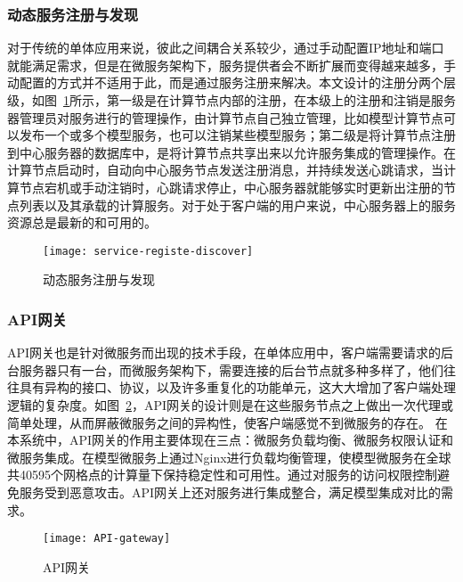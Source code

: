 \subsubsection{动态服务注册与发现}
对于传统的单体应用来说，彼此之间耦合关系较少，通过手动配置IP地址和端口就能满足需求，但是在微服务架构下，服务提供者会不断扩展而变得越来越多，手动配置的方式并不适用于此，而是通过服务注册来解决。本文设计的注册分两个层级，如图~\ref{fig:service-registe-discover}所示，第一级是在计算节点内部的注册，在本级上的注册和注销是服务器管理员对服务进行的管理操作，由计算节点自己独立管理，比如模型计算节点可以发布一个或多个模型服务，也可以注销某些模型服务；第二级是将计算节点注册到中心服务器的数据库中，是将计算节点共享出来以允许服务集成的管理操作。在计算节点启动时，自动向中心服务节点发送注册消息，并持续发送心跳请求，当计算节点宕机或手动注销时，心跳请求停止，中心服务器就能够实时更新出注册的节点列表以及其承载的计算服务。对于处于客户端的用户来说，中心服务器上的服务资源总是最新的和可用的。

\begin{figure}[!htbp]
    \centering
    \texttt{[image: service-registe-discover]}
    \caption{动态服务注册与发现}
    \label{fig:service-registe-discover}
\end{figure}

\subsubsection{API网关}
API网关也是针对微服务而出现的技术手段，在单体应用中，客户端需要请求的后台服务器只有一台，而微服务架构下，需要连接的后台节点就多种多样了，他们往往具有异构的接口、协议，以及许多重复化的功能单元，这大大增加了客户端处理逻辑的复杂度。如图~\ref{fig:API-gateway}，API网关的设计则是在这些服务节点之上做出一次代理或简单处理，从而屏蔽微服务之间的异构性，使客户端感觉不到微服务的存在。
在本系统中，API网关的作用主要体现在三点：微服务负载均衡、微服务权限认证和微服务集成。在模型微服务上通过Nginx进行负载均衡管理，使模型微服务在全球共40595个网格点的计算量下保持稳定性和可用性。通过对服务的访问权限控制避免服务受到恶意攻击。API网关上还对服务进行集成整合，满足模型集成对比的需求。

\begin{figure}[!htbp]
    \centering
    \texttt{[image: API-gateway]}
    \caption{API网关}
    \label{fig:API-gateway}
\end{figure}



